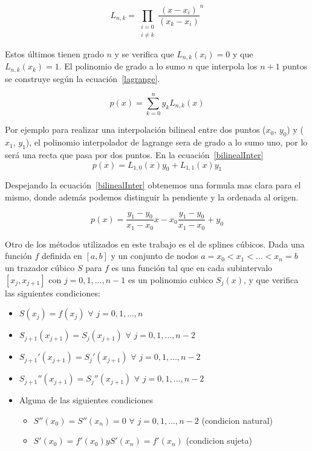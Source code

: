 \documentclass[a4paper]{article}
\begin{document}
\begin{equation}
L_{n,k}= \prod_{\substack{i=0\\i\neq k}} \frac{(x-x_{i})}{(x_{k}-x_{i})}^{n}
\label{Ls}
\end{equation}

Estos últimos tienen grado $ n $ y se verifica que  $ L_{n,k}(x_{i})= 0 $ y que $ L_{n,k}(x_{k})= 1 $. El polinomio de grado a lo sumo $ n $ que interpola los $ n +1 $ puntos se construye según la ecuación~\ref{lagrange}.

\begin{equation}
p(x)= \sum_{k=0}^{n}y_{k}L_{n,k}(x)
\label{lagrange}
\end{equation}

Por ejemplo para realizar una interpolación bilineal entre dos puntos ($ x_{0} $, $ y_{0} $) y ($ x_{1} $, $ y_{1} $), el polinomio interpolador de lagrange sera de grado a lo sumo uno, por lo será una recta que pasa por dos puntos. En la ecuación~\ref{bilinealInter}
\begin{equation}
p(x)= L_{1,0}(x)y_{0} + L_{1,1}(x)y_{1}
\label{bilinealInter}
\end{equation}

Despejando la ecuación~\ref{bilinealInter} obtenemos una formula mas clara para el mismo, donde además podemos distinguir la pendiente y la ordenada al origen.

\begin{equation}
p(x)= \frac{y_{1}-y_{0}}{x_{1}-x_{0}} x - x_{0} \frac{y_{1}-y_{0}}{x_{1}-x_{0}} + y_{0}
\label{bilineal}
\end{equation}

Otro de los métodos utilizados en este trabajo es el de splines cúbicos. Dada una función $f$ definida en $[a,b]$ y un conjunto de nodos $a=x_0<x_1<\ldots<x_n=b$ un trazador cúbico $S$ para $f$ es una función tal que en cada subintervalo $[x_j, x_{j+1}]$ con  $j=0,1,\ldots,n-1$ es un polinomio cubico $S_j(x)$, y que verifica las siguientes condiciones:\cite{burden}


\begin{itemize}
  \item $S(x_j)=f(x_j)$ $ \forall $ $j=0,1,\ldots,n$
  \item $S_{j+1}(x_{j+1})=S_j(x_{j+1})$ $ \forall $ $j=0,1,\ldots,n-2$
  \item $S_{j+1}'(x_{j+1})=S_j'(x_{j+1})$ $ \forall $ $j=0,1,\ldots,n-2$
  \item $S_{j+1}''(x_{j+1})=S_j''(x_{j+1})$ $ \forall $ $j=0,1,\ldots,n-2$
  \item Alguna de las siguientes condiciones
  	\begin{itemize}
  		\item $S''(x_0)=S''(x_n)=0$ $ \forall $ $j=0,1,\ldots,n-2$ (condicion natural)
 		 \item $S'(x_0)=f'(x_0) y S'(x_n)=f'(x_n)$ (condicion sujeta)
	\end{itemize}
\end{itemize}
\end{document}
